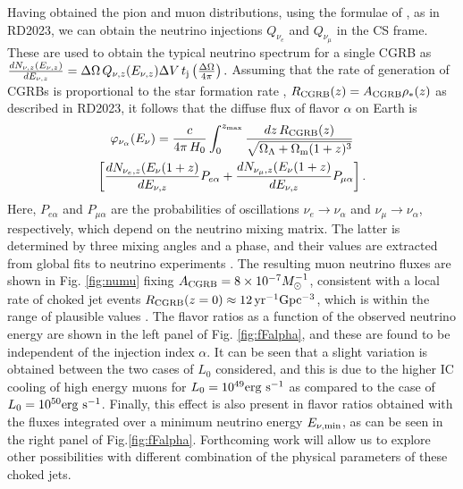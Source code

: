 \documentclass[baaa]{baaa}
\begin{document}
Having obtained the pion and muon distributions, using the formulae of \cite{lipari2007}, as in RD2023, we can obtain the neutrino injections $Q_{\nu_e}$ and $Q_{\nu_\mu}$ in the CS frame. These are used to obtain the typical neutrino spectrum
for a single CGRB as $
 \frac{dN_{\nu,z}(E_{\nu,z})}{dE_{\nu,z}}= \Delta\Omega\, Q_{\nu,z}(E_{\nu,z})\Delta V\, t_{\rm j} \left(\frac{\Delta\Omega}{4\pi}\right).
$ Assuming that the rate of generation of CGRBs is proportional to the star formation rate \citep{madau2014}, $R_{\rm CGRB}(z)=A_{\rm CGRB}\rho_*(z)$   
as described in RD2023, it follows that the diffuse flux of flavor $\alpha$ on Earth is
\begin{multline}
 \varphi_{\nu_\alpha}(E_\nu)= \frac{c}{4\pi\,H_0}\int_{0}^{z_{\rm max}}\frac{dz \,R_{\rm CGRB}(z)}{\sqrt{\Omega_\Lambda+\Omega_{\rm m}(1+z)^3}}\\
  \left[\frac{dN_{\nu_e,z}(E_\nu(1+z)}{dE_{\nu,z}}P_{e\alpha}+ \frac{dN_{\nu_\mu,z}(E_\nu(1+z)}{dE_{\nu,z}}P_{\mu\alpha} \right].
\end{multline}
Here, $P_{e\alpha}$ and $P_{\mu\alpha}$ are the probabilities of oscillations $\nu_e\rightarrow \nu_\alpha$ and $\nu_\mu\rightarrow \nu_\alpha$, respectively, which depend on the neutrino mixing matrix. The latter is determined by three mixing angles and a phase, and their values are extracted from global fits to neutrino experiments \citep{esteban2020}. The resulting muon neutrino fluxes are shown in Fig. \ref{fig:numu} fixing $A_{\rm CGRB}=8\times 10^{-7}M_\odot^{-1}$, consistent with a local rate of choked jet events $R_{\rm CGRB}(z=0)\approx 12\,{\rm yr^{-1}Gpc^{-3}}$, which is within the range of plausible values \citep[e.g.][]{he2018}. The flavor ratios as a function of the observed neutrino energy are shown in the left panel of Fig. \ref{fig:fFalpha}, and these are found to be independent of the injection index $\alpha$. It can be seen that a slight variation is obtained between the two cases of $L_0$ considered, and this is due to the higher IC cooling of high energy muons for $L_0=10^{49}{\rm erg\ s^{-1}}$ as compared to the case of $L_0=10^{50}{\rm erg \ s^{-1}}$. Finally, this effect is also present in flavor ratios obtained with the fluxes integrated over a minimum neutrino energy $E_{\nu,\rm min}$, as can be seen in the right panel of Fig.\ref{fig:fFalpha}.  Forthcoming work will allow us to explore other possibilities with different combination of the physical parameters of these choked jets. 
\end{document}
